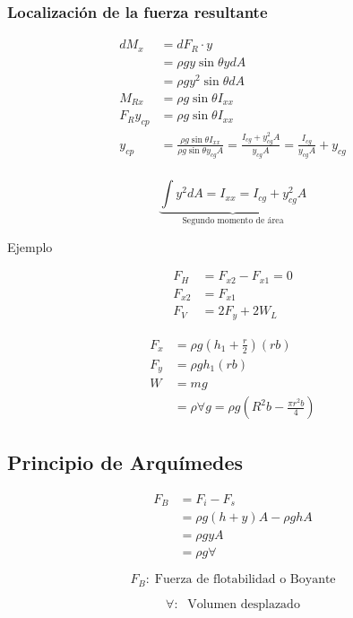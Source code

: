 \subsubsection{Localización de la fuerza resultante}
\[
    \begin{split}
        dM_{x} & = dF_{R} \cdot y \\
        & = \rho g y \sin{ \theta } y dA \\
        & = \rho g y^{2} \sin{ \theta } dA \\
        M_{Rx} & = \rho g \sin{ \theta } I_{xx} \\
        F_{R} y_{cp} & = \rho g \sin{ \theta } I_{xx} \\
        y_{cp} & = \frac{ \rho g \sin{ \theta } I_{xx} }{ \rho g \sin{ \theta } y_{cg} A } = \frac{ I_{cg} + y_{cg}^{2} A }{ y_{cg} A } = \frac{ I_{cg} }{ y_{cg} A } + y_{cg} \\
    \end{split}
\]

\[
    \underbrace{ \int y^{2} dA = I_{xx} = I_{cg} + y_{cg}^{2} A }_{ \text{Segundo momento de área} }
\] 


Ejemplo


\[
    \begin{split}
        F_{H} & = F_{x2} - F_{x1} = 0 \\
        F_{x2} & = F_{x1} \\
        F_{V} & = 2 F_{y} + 2W_{L}
    \end{split}
\]

\[
    \begin{split}
        F_{x} & = \rho g (h_{1} + \frac{ r }{ 2 }) (rb) \\
        F_{y} & = \rho g h_{1} (rb) \\
        W & = mg \\
        & = \rho \forall g = \rho g (R^{2}b - \frac{ \pi r^{2} b }{ 4 })
    \end{split}
\]

\subsection{Principio de Arquímedes}

\[
    \begin{split}
        F_{B} & = F_{i} - F_{s} \\
        & = \rho g ( h + y ) A - \rho g h A \\
        & = \rho g y A \\
        & = \rho g \forall
    \end{split}
\]

\[
    F_{B}: \; \text{Fuerza de flotabilidad o Boyante}
\]

\[
    \forall: \; \text{ Volumen desplazado}
\]